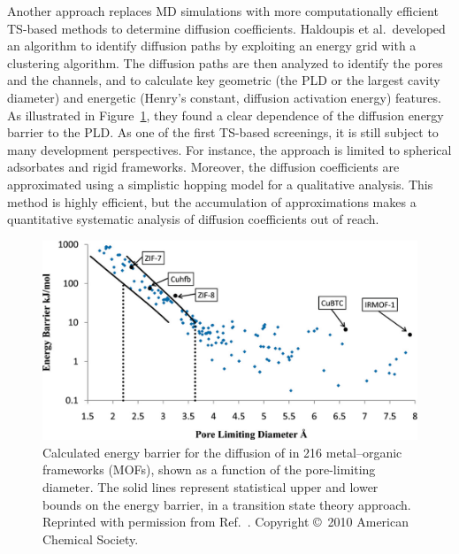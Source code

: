 \documentclass[main.tex]{subfiles}
\begin{document}
Another approach replaces MD simulations with more computationally efficient TS-based methods to determine diffusion coefficients.
Haldoupis et al.\ developed an algorithm to identify diffusion paths by exploiting an energy grid with a clustering algorithm. The diffusion paths are then analyzed to identify the pores and the channels, and to calculate key geometric (the PLD or the largest cavity diameter) and energetic (Henry's constant, diffusion activation energy) features.\autocite{Haldoupis_2010}
As illustrated in Figure~\ref{fgr:Haldoupis_2010}, they found a clear dependence of the diffusion energy barrier to the PLD. As one of the first TS-based screenings, it is still subject to many development perspectives. For instance, the approach is limited to spherical adsorbates and rigid frameworks. Moreover, the diffusion coefficients are approximated using a simplistic hopping model for a qualitative analysis. This method is highly efficient, but the accumulation of approximations makes a quantitative systematic analysis of diffusion coefficients out of reach.

\begin{figure}[ht]
\centering
  \includegraphics[width=0.7\linewidth]{figures/1-screening/Haldoupis_2010.jpeg}
  \caption{Calculated energy barrier for the diffusion of  in 216 metal--organic frameworks (MOFs), shown as a function of the pore-limiting diameter. The solid lines represent statistical upper and lower bounds on the energy barrier, in a transition state theory approach. Reprinted with permission from Ref.~\cite{Haldoupis_2010}. Copyright \copyright\  2010 American Chemical Society.}\label{fgr:Haldoupis_2010}
\end{figure}
\end{document}
